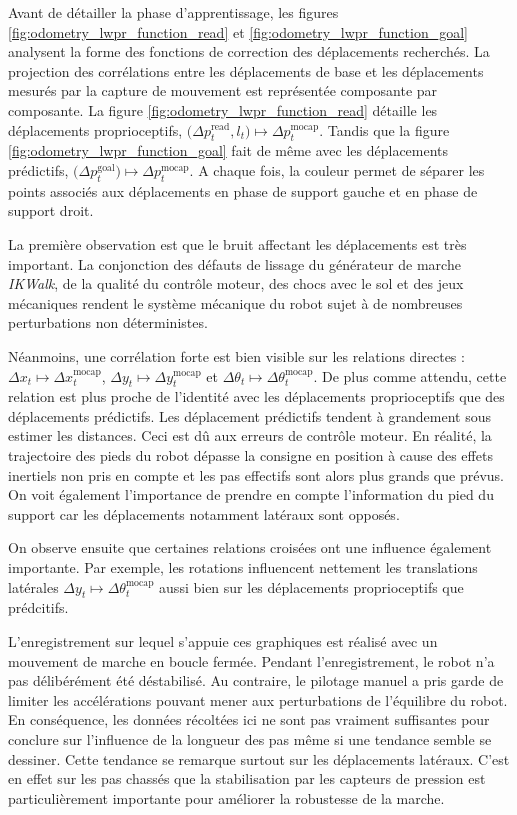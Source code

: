 Avant de détailler la phase d'apprentissage, les figures \ref{fig:odometry_lwpr_function_read} 
et \ref{fig:odometry_lwpr_function_goal} analysent la forme des fonctions de correction
des déplacements recherchés.
La projection des corrélations entre les déplacements de base et les déplacements mesurés 
par la capture de mouvement est représentée composante par composante.
La figure \ref{fig:odometry_lwpr_function_read} détaille les déplacements proprioceptifs, 
$\big(\Delta p_{t}^{\text{read}}, l_{t}\big) \longmapsto \Delta p_{t}^{\text{mocap}}$.
Tandis que la figure \ref{fig:odometry_lwpr_function_goal} fait de même 
avec les déplacements prédictifs, 
$\big(\Delta p_{t}^{\text{goal}}\big) \longmapsto \Delta p_{t}^{\text{mocap}}$.
A chaque fois, la couleur permet de séparer les points associés aux déplacements en phase 
de support gauche et en phase de support droit.

La première observation est que le bruit affectant les déplacements est très important.
La conjonction des défauts de lissage du générateur de marche \textit{IKWalk}, de la qualité 
du contrôle moteur, des chocs avec le sol et des jeux mécaniques rendent 
le système mécanique du robot sujet à de nombreuses perturbations non déterministes.

Néanmoins, une corrélation forte est bien visible sur les relations
directes : $\Delta x_{t} \mapsto \Delta x_{t}^{\text{mocap}}$, 
$\Delta y_{t} \mapsto \Delta y_{t}^{\text{mocap}}$ et 
$\Delta \theta_{t} \mapsto \Delta \theta_{t}^{\text{mocap}}$.
De plus comme attendu, cette relation est plus proche de l'identité avec 
les déplacements proprioceptifs que des déplacements prédictifs.
Les déplacement prédictifs tendent à grandement sous estimer les distances.
Ceci est dû aux erreurs de contrôle moteur. En réalité, la trajectoire des pieds du
robot dépasse la consigne en position à cause des effets inertiels non pris en compte
et les pas effectifs sont alors plus grands que prévus. 
On voit également l'importance de prendre en compte l'information du pied du support 
car les déplacements notamment latéraux sont opposés.

On observe ensuite que certaines relations croisées ont une influence également importante.
Par exemple, les rotations influencent nettement les translations latérales 
$\Delta y_{t} \mapsto \Delta \theta_{t}^{\text{mocap}}$ aussi bien sur les déplacements 
proprioceptifs que prédcitifs.

L'enregistrement sur lequel s'appuie ces graphiques est réalisé avec un mouvement
de marche en boucle fermée. 
Pendant l'enregistrement, le robot n'a pas délibérément été déstabilisé. 
Au contraire, le pilotage manuel a pris garde de limiter les accélérations pouvant mener 
aux perturbations de l'équilibre du robot.
En conséquence, les données récoltées ici ne sont pas vraiment suffisantes 
pour conclure sur l'influence de la longueur des pas même si une tendance semble se dessiner.
Cette tendance se remarque surtout sur les déplacements latéraux. 
C'est en effet sur les pas chassés que la stabilisation par les capteurs de pression 
est particulièrement importante pour améliorer la robustesse de la marche.

